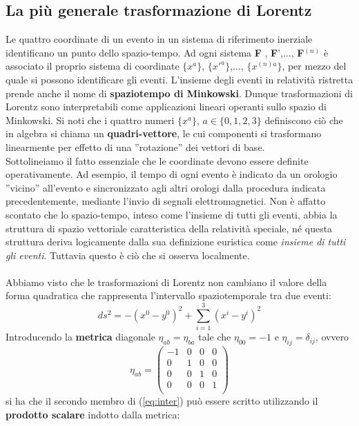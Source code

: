 \documentclass[a4paper,11pt]{book}
\theoremstyle{plain}
\theoremstyle{definition}
\begin{document}
\subsection{La più generale trasformazione di Lorentz}
Le quattro coordinate di un evento in un sistema di riferimento inerziale identificano un punto dello spazio-tempo. Ad ogni sistema \textbf{F} , \textbf{F}',$\ldots$, \textbf{F}$^{(n)}$ è associato il proprio sistema di coordinate $\{x^a\}$, $\{x'^a\}$,$\ldots$, $\{x^{(n)a}\}$, per mezzo del quale si possono identificare gli eventi. L'insieme degli eventi in relatività ristretta prende anche il nome di \textbf{spaziotempo di Minkowski}. Dunque trasformazioni di Lorentz sono interpretabili come applicazioni 
lineari operanti sullo spazio di Minkowski. Si noti che i quattro numeri $\{x^a\}$, $a\in\{0,1,2,3\}$ definiscono ciò che in algebra si chiama un \textbf{quadri-vettore}, le cui componenti si trasformano linearmente per effetto di una 
''rotazione'' dei vettori di base. \\
Sottolineiamo il fatto essenziale che le coordinate devono essere definite operativamente. Ad esempio, il tempo di ogni evento è indicato da un orologio ''vicino'' all'evento e sincronizzato agli altri orologi dalla procedura indicata precedentemente, mediante l'invio di segnali elettromagnetici. Non è affatto scontato che lo spazio-tempo, inteso come 
l'insieme di tutti gli eventi, abbia la struttura di spazio vettoriale caratteristica della relatività speciale, né questa struttura deriva logicamente dalla sua definizione euristica come 
\emph{insieme di tutti gli eventi}. Tuttavia questo è ciò che si osserva localmente. \\ \\
Abbiamo visto che le trasformazioni di Lorentz non cambiano il valore della forma quadratica che rappresenta l'intervallo spaziotemporale tra due eventi:
\begin{equation}\label{eq:inter}
ds^2=-(x^0-y^0)^2+\sum_{i=1}^3(x^i-y^i)^2
\end{equation}
Introducendo la \textbf{metrica} diagonale $\eta_{ab}=\eta_{ba}$ tale che $\eta_{00}=-1$ e $\eta_{ij}=\delta_{ij}$, ovvero
\[
\eta_{ab}=
\left( \begin{array}{cccc}
-1 & 0 & 0 & 0 \\
0 & 1 & 0 & 0 \\
0 & 0 & 1 & 0 \\
0 & 0 & 0 & 1 \\
\end{array}\right)
\]
si ha che il secondo membro di (\ref{eq:inter}) può essere scritto utilizzando il \textbf{prodotto scalare} indotto dalla metrica:
\end{document}

